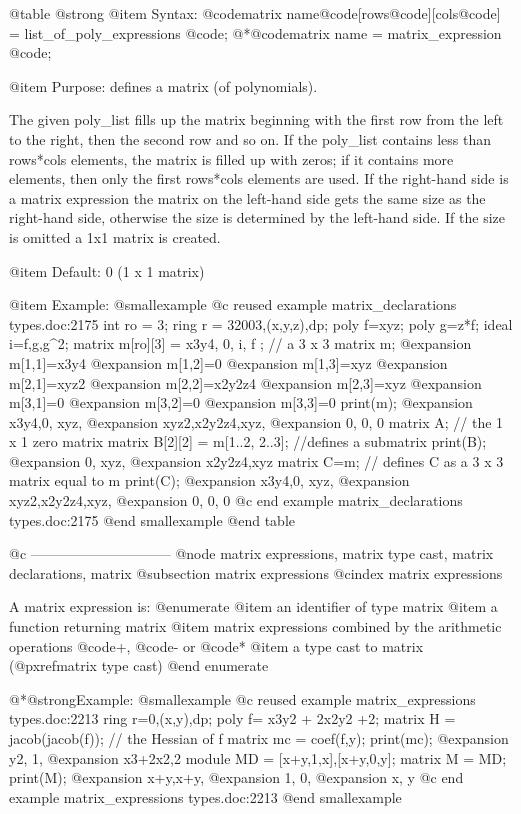 {{{{{{@table @strong
@item Syntax:
@code{matrix} name@code{[}rows@code{][}cols@code{] =} list_of_poly_expressions @code{;}
@*@code{matrix} name = matrix_expression @code{;}

@item Purpose:
defines a matrix (of polynomials).

The given poly_list fills up the matrix beginning with the first row
from the left to the right, then the second row and so on.
If the poly_list contains less than rows*cols elements,
the matrix is filled up with zeros; if it contains more
elements, then only the first rows*cols elements are used.
If the right-hand side is a matrix expression
the matrix on the left-hand side gets the same size as the right-hand side,
otherwise the size is determined by the left-hand side.
If the size is omitted a 1x1 matrix is created.

@item Default:
0 (1 x 1 matrix)

@item Example:
@smallexample
@c reused example matrix_declarations types.doc:2175 
  int ro = 3;
  ring r = 32003,(x,y,z),dp;
  poly f=xyz;
  poly g=z*f;
  ideal i=f,g,g^2;
  matrix m[ro][3] = x3y4, 0, i, f ; // a 3 x 3 matrix
  m;
@expansion{} m[1,1]=x3y4
@expansion{} m[1,2]=0
@expansion{} m[1,3]=xyz
@expansion{} m[2,1]=xyz2
@expansion{} m[2,2]=x2y2z4
@expansion{} m[2,3]=xyz
@expansion{} m[3,1]=0
@expansion{} m[3,2]=0
@expansion{} m[3,3]=0
  print(m);
@expansion{} x3y4,0,     xyz,
@expansion{} xyz2,x2y2z4,xyz,
@expansion{} 0,   0,     0   
  matrix A;   // the 1 x 1 zero matrix
  matrix B[2][2] = m[1..2, 2..3]; //defines a submatrix
  print(B);
@expansion{} 0,     xyz,
@expansion{} x2y2z4,xyz 
  matrix C=m; // defines C as a 3 x 3 matrix equal to m
  print(C);
@expansion{} x3y4,0,     xyz,
@expansion{} xyz2,x2y2z4,xyz,
@expansion{} 0,   0,     0   
@c end example matrix_declarations types.doc:2175
@end smallexample
@end table

@c ------------------------------
@node matrix expressions, matrix type cast, matrix declarations, matrix
@subsection matrix expressions
@cindex matrix expressions

A matrix expression is:
@enumerate
@item
an identifier of type matrix
@item
a function returning matrix
@item
matrix expressions combined by the arithmetic operations
@code{+}, @code{-} or @code{*}
@item
a type cast to matrix (@pxref{matrix type cast})
@end enumerate

@*@strong{Example:}
@smallexample
@c reused example matrix_expressions types.doc:2213 
  ring r=0,(x,y),dp;
  poly f= x3y2 + 2x2y2 +2;
  matrix H = jacob(jacob(f));    // the Hessian of f
  matrix mc = coef(f,y);
  print(mc);
@expansion{} y2,    1,
@expansion{} x3+2x2,2 
  module MD = [x+y,1,x],[x+y,0,y];
  matrix M = MD;
  print(M);
@expansion{} x+y,x+y,
@expansion{} 1,  0,  
@expansion{} x,  y   
@c end example matrix_expressions types.doc:2213
@end smallexample

}}}}}}
